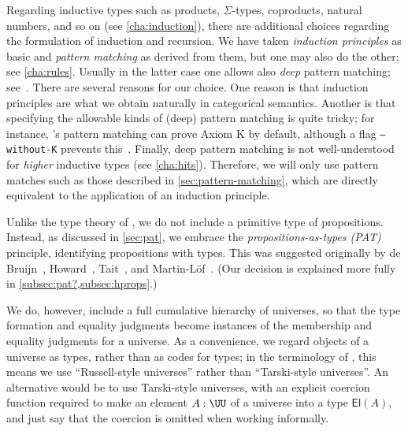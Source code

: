 Regarding inductive types such as products, $\Sigma$-types, coproducts, natural numbers, and so on (see \cref{cha:induction}), there are additional choices regarding the formulation of induction and recursion.
%
We have taken \emph{induction principles} as basic and \emph{pattern matching} as derived from them, but one may also do the other; see \cref{cha:rules}.
Usually in the latter case one allows also \emph{deep} pattern matching; see~\cite{Coquand92Pattern}.
There are several reasons for our choice.
One reason is that induction principles are what we obtain naturally in categorical semantics.
Another is that specifying the allowable kinds of (deep) pattern matching is quite tricky;
for instance, \Agda's
%
pattern matching can prove Axiom K by default,
%
although a flag \texttt{--without-K} prevents this~\cite{CDP14}.
Finally, deep pattern matching is not well-understood for \emph{higher} inductive types (see \cref{cha:hits}).
Therefore, we will only use pattern matches such as those described in \cref{sec:pattern-matching}, which are directly equivalent to the application of an induction principle.

%
Unlike the type theory of \Coq, we do not include a primitive type of propositions.  Instead, as discussed in \cref{sec:pat}, we embrace 
the \emph{propositions-as-types (PAT)} principle, identifying propositions with types.
This was suggested originally by de Bruijn~\cite{deBruijn-1973}, Howard~\cite{howard:pat}, Tait~\cite{Tait-1968}, and Martin-L\"{o}f~\cite{Martin-Lof-1972}.
(Our decision is explained more fully in \cref{subsec:pat?,subsec:hprops}.)

We do, however, include a full cumulative hierarchy of universes, so that the type formation and equality judgments become instances of the membership and equality judgments for a universe.
As a convenience, we regard objects of a universe as types, rather than as codes for types; in the terminology of \cite{martin-lof:bibliopolis}, this means we use ``Russell-style universes'' rather than ``Tarski-style universes''.
%
%
An alternative would be to use Tarski-style universes, with an explicit coercion function required to make an element $A:\UU$ of a universe into a type $\mathsf{El}(A)$, and just say that the coercion is omitted when working informally.

